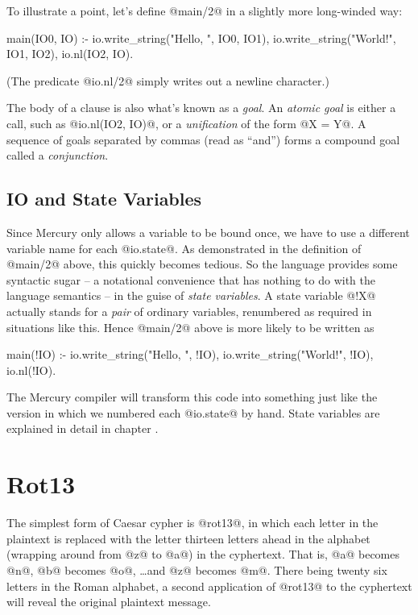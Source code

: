 To illustrate a point, let's define @main/2@ in a slightly more
long-winded way:
\begin{myverbatim}
main(IO0, IO) :-
    io.write_string("Hello, ", IO0, IO1),
    io.write_string("World!",  IO1, IO2),
    io.nl(IO2, IO).
\end{myverbatim}
(The predicate @io.nl/2@ simply writes out a newline character.)

The body of a clause is also what's known as a \emph{goal}.  An \emph{atomic
goal} is either a call, such as @io.nl(IO2, IO)@, or a \emph{unification} of
the form @X = Y@.  A sequence of goals separated by commas (read as ``and'')
forms a compound goal called a \emph{conjunction}.

\subsection{IO and State Variables}

Since Mercury only allows a variable to be bound once, we have to use a
different variable name for each @io.state@.  As demonstrated in the
definition of @main/2@ above, this quickly becomes tedious.  So the language
provides some syntactic sugar -- a notational convenience that has nothing
to do with the language semantics -- in the guise of \emph{state variables}.
A state variable @!X@ actually stands for a \emph{pair} of ordinary
variables, renumbered as required in situations like this.  Hence 
@main/2@ above is more likely to be written as
\begin{myverbatim}
main(!IO) :-
    io.write_string("Hello, ", !IO),
    io.write_string("World!",  !IO),
    io.nl(!IO).
\end{myverbatim}
The Mercury compiler will transform this code into something just like the
version in which we numbered each @io.state@ by hand.  State variables are
explained in detail in chapter \XXX{}.



\section{Rot13}

The simplest form of Caesar cypher is @rot13@, in which each letter in the
plaintext is replaced with the letter thirteen letters ahead in the alphabet
(wrapping around from @z@ to @a@) in the cyphertext.  That is, @a@ becomes
@n@, @b@ becomes @o@, \ldots and @z@ becomes @m@.  There being twenty six
letters in the Roman alphabet, a second application of @rot13@ to the
cyphertext will reveal the original plaintext message.


